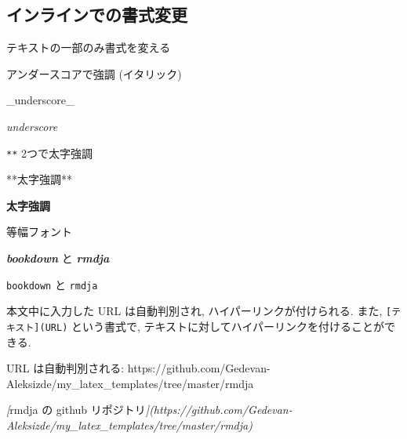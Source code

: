 \documentclass[
  xelatex,ja=standard,jafont=noto]{bxjsbook}
\newenvironment{Shaded}{\begin{snugshade}}{\end{snugshade}}
\newcommand{\CommentTok}[1]{\textcolor[rgb]{0.56,0.35,0.01}{\textit{#1}}}
\newcommand{\InformationTok}[1]{\textcolor[rgb]{0.56,0.35,0.01}{\textbf{\textit{#1}}}}
\newcommand{\NormalTok}[1]{#1}
\newcommand{\OtherTok}[1]{\textcolor[rgb]{0.56,0.35,0.01}{#1}}
\theoremstyle{definition}
\theoremstyle{definition}
\theoremstyle{definition}
\theoremstyle{definition}
\theoremstyle{remark}
\begin{document}
\hypertarget{ux30a4ux30f3ux30e9ux30a4ux30f3ux3067ux306eux66f8ux5f0fux5909ux66f4}{%
\subsection{インラインでの書式変更}\label{ux30a4ux30f3ux30e9ux30a4ux30f3ux3067ux306eux66f8ux5f0fux5909ux66f4}}

テキストの一部のみ書式を変える

アンダースコアで強調 (イタリック)

\begin{Shaded}
\begin{Highlighting}[]
\NormalTok{\_underscore\_}
\end{Highlighting}
\end{Shaded}

\emph{underscore}

\texttt{**} 2つで太字強調

\begin{Shaded}
\begin{Highlighting}[]
\NormalTok{**太字強調**}
\end{Highlighting}
\end{Shaded}

\textbf{太字強調}

等幅フォント

\begin{Shaded}
\begin{Highlighting}[]
\InformationTok{\textasciigrave{}bookdown\textasciigrave{}}\NormalTok{ と }\InformationTok{\textasciigrave{}rmdja\textasciigrave{}}
\end{Highlighting}
\end{Shaded}

\texttt{bookdown} と \texttt{rmdja}

本文中に入力した URL は自動判別され, ハイパーリンクが付けられる. また,
\texttt{{[}テキスト{]}(URL)} という書式で,
テキストに対してハイパーリンクを付けることができる.

\begin{Shaded}
\begin{Highlighting}[]

\NormalTok{URL は自動判別される: https://github.com/Gedevan{-}Aleksizde/my\_latex\_templates/tree/master/rmdja}

\CommentTok{[}\OtherTok{\textasciigrave{}rmdja\textasciigrave{} の github リポジトリ}\CommentTok{](https://github.com/Gedevan{-}Aleksizde/my\_latex\_templates/tree/master/rmdja)}
\end{Highlighting}
\end{Shaded}
\end{document}
